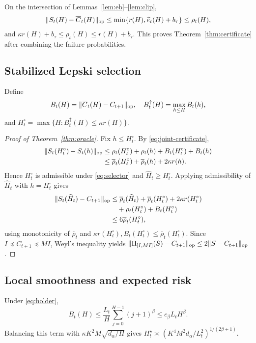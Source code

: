 On the intersection of Lemmas~\ref{lem:eb}--\ref{lem:clip},
\begin{equation}
 \|S_t(H)-\overline C_t(H)\|_{\mathrm{op}}
 \le \min\{r(H),\widehat e_t(H)+b_\tau\}
 \le \rho_t(H),
 \label{eq:joint-certificate}
\end{equation}
and $\kappa r(H)+b_\tau\le\rho_t(H)\le r(H)+b_\tau$.  This proves Theorem~\ref{thm:certificate} after combining the failure probabilities.

\subsection{Stabilized Lepski selection}

Define
\begin{equation}
 B_t(H)=\|\overline C_t(H)-C_{t+1}\|_{\mathrm{op}},\quad
 B_t^\uparrow(H)=\max_{h\le H}B_t(h),
\end{equation}
and $H_t^\circ=\max\{H:B_t^\uparrow(H)\le\kappa r(H)\}$.

\begin{proof}[Proof of Theorem~\ref{thm:oracle}]
Fix $h\le H_t^\circ$.  By \eqref{eq:joint-certificate},
\begin{align}
 \|S_t(H_t^\circ)-S_t(h)\|_{\mathrm{op}}
 &\le\rho_t(H_t^\circ)+\rho_t(h)+B_t(H_t^\circ)+B_t(h)\\
 &\le\overline\rho_t(H_t^\circ)+\overline\rho_t(h)+2\kappa r(h).
\end{align}
Hence $H_t^\circ$ is admissible under \eqref{eq:selector} and $\widehat H_t\ge H_t^\circ$.  Applying admissibility of $\widehat H_t$ with $h=H_t^\circ$ gives
\begin{align}
 \|S_t(\widehat H_t)-C_{t+1}\|_{\mathrm{op}}
 &\le\overline\rho_t(\widehat H_t)+\overline\rho_t(H_t^\circ)+2\kappa r(H_t^\circ)\\
 &\quad+\rho_t(H_t^\circ)+B_t(H_t^\circ)\\
 &\le6\overline\rho_t(H_t^\circ),
\end{align}
using monotonicity of $\overline\rho_t$ and $\kappa r(H_t^\circ),B_t(H_t^\circ)\le\overline\rho_t(H_t^\circ)$.  Since $I\preceq C_{t+1}\preceq MI$, Weyl's inequality yields
$\|\Pi_{[I,MI]}(S)-C_{t+1}\|_{\mathrm{op}}\le2\|S-C_{t+1}\|_{\mathrm{op}}$.  \end{proof}

\subsection{Local smoothness and expected risk}

Under \eqref{eq:holder},
\begin{equation}
 B_t(H)\le\frac{L_t}{H}\sum_{j=0}^{H-1}(j+1)^\beta
 \le c_\beta L_tH^\beta.
 \label{eq:bias-holder}
\end{equation}
Balancing this term with $\kappa K^2M\sqrt{d_\alpha/H}$ gives
$H_t^\star\asymp(K^4M^2d_\alpha/L_t^2)^{1/(2\beta+1)}$.

